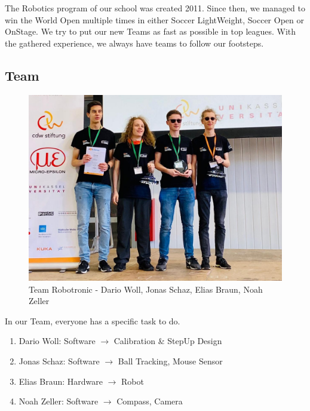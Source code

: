 \documentclass{scrartcl}
\begin{document}
The Robotics program of our school was created 2011. Since then, we managed to win the World Open
multiple times in either Soccer LightWeight, Soccer Open or OnStage.
We try to put our new Teams as fast as possible in top leagues. With the gathered experience, we always
have teams to follow our footsteps.
\newpage

\subsection{Team}
\begin{figure}[h]
    \centering
    \includegraphics[width=\textwidth]{img/Robotronic.jpg}
    \caption{Team Robotronic - Dario Woll, Jonas Schaz, Elias Braun, Noah Zeller}
    \label{fig:team}
\end{figure}
In our Team, everyone has a specific task to do.
\begin{enumerate}
    \item{Dario Woll: Software $\rightarrow$ Calibration \& StepUp Design}
    \item{Jonas Schaz: Software  $\rightarrow$ Ball Tracking, Mouse Sensor}
    \item{Elias Braun: Hardware $\rightarrow$ Robot}
    \item{Noah Zeller: Software $\rightarrow$ Compass, Camera}
\end{enumerate}
\newpage
\end{document}
